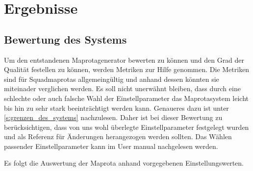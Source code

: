 \section{Ergebnisse}

    \subsection{Bewertung des Systems}
        \label{sec:bewerten_des_systems}
        Um den entstandenen Maprotagenerator bewerten zu können und den Grad der Qualität festellen zu können,
        werden Metriken zur Hilfe genommen. Die Metriken sind für Squadmaprotas
        allgemeingültig und anhand dessen könnten sie miteinader verglichen werden. Es soll nicht unerwähnt bleiben,
        dass durch eine schlechte oder auch falsche Wahl der Einstellparameter das Maprotasystem leicht bis hin zu
        sehr stark beeinträchtigt werden kann. Genaueres dazu ist unter \ref{s:grenzen_des_systems} nachzulesen.
        Daher ist bei dieser Bewertung zu berücksichtigen, dass von uns wohl überlegte Einstellparameter festgelegt wurden
        und als Referenz für Änderungen herangezogen werden sollten.
        Das Wählen passender Einstellparameter kann im User manual nachgelesen werden.

        Es folgt die Auswertung der Maprota anhand vorgegebenen Einstellungswerten.\\

